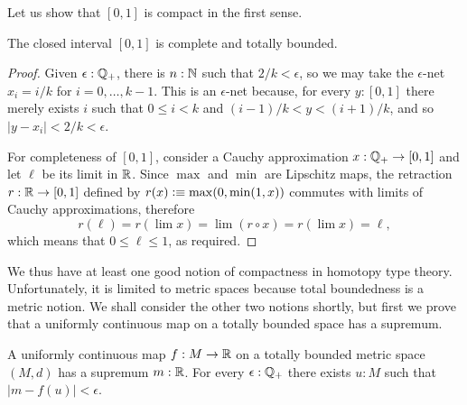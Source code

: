 Let us show that $[0,1]$ is compact in the first sense.

\begin{thm} \label{analysis-interval-ctb}
  The closed interval $[0,1]$ is complete and totally bounded.
\end{thm}

\begin{proof}
  Given $\epsilon : \mathbb{Q}_{+}$, there is $n : \mathbb{N}$ such that $2/k < \epsilon$, so we may take the
  $\epsilon$-net $x_i = i/k$ for $i = 0, \ldots, k-1$. This is an $\epsilon$-net because,
  for every $y : [0,1]$ there merely exists $i$ such that $0 \leq i < k$ and $(i -
  1)/k < y < (i+1)/k$, and so $|y - x_i| < 2/k < \epsilon$.

  For completeness of $[0,1]$, consider a Cauchy approximation $x : \mathbb{Q}_{+} \to
  [0,1]$ and let $\ell$ be its limit in $\mathbb{R}$. Since $\max$ and $\min$ are Lipschitz maps,
  the retraction $r : \mathbb{R} \to [0,1]$ defined by $r(x) \vcentcolon\equiv \max(0, \min(1, x))$ commutes
  with limits of Cauchy approximations, therefore
  \begin{equation*}
    r(\ell) =
    r (\lim x) =
    \lim (r \circ x) =
    r (\lim x) =
    \ell,
  \end{equation*}
  which means that $0 \leq \ell \leq 1$, as required.
\end{proof}

We thus have at least one good notion of compactness in homotopy type theory.
Unfortunately, it is limited to metric spaces because total boundedness is a metric
notion. We shall consider the other two notions shortly, but first we prove that a
uniformly continuous map on a totally bounded space has a supremum.

\begin{thm} \label{ctb-uniformly-continuous-sup}
  A uniformly continuous map $f : M \to \mathbb{R}$ on a totally bounded metric space
  $(M, d)$ has a supremum $m : \mathbb{R}$. For every $\epsilon : \mathbb{Q}_{+}$ there exists $u : M$ such
  that $|m - f(u)| < \epsilon$.
\end{thm}

